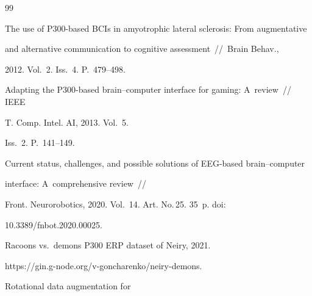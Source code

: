 {\small\frenchspacing

{%


\begin{thebibliography}{99}



The use of P300-based BCIs in amyotrophic lateral sclerosis: From augmentative 

and alternative communication to cognitive assessment~/\!\!/~Brain  Behav., 

2012. Vol.~2. Iss.~4. P.~479--498.





Adapting the P300-based brain--computer interface for gaming: A~review~/\!\!/ IEEE 

T. Comp. Intel. AI, 2013. Vol.~5. 

Iss.~2. P.~141--149.





Current status, challenges, and possible solutions of EEG-based brain--computer 

interface: A~comprehensive review~/\!\!/

Front. Neurorobotics, 2020. Vol.~14. Art. No.\,25. 35~p. doi: 

10.3389\!/\!fnbot.2020.00025.




 Racoons vs.\ demons P300 ERP dataset of Neiry, 2021.  

{\sf https://gin.g-node.org/v-goncharenko/neiry-demons}.




 Rotational data augmentation for 


\end{thebibliography}}}
